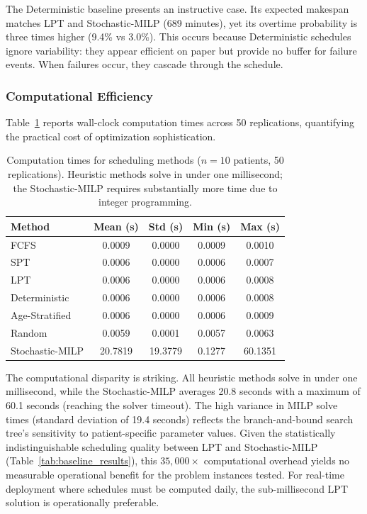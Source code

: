 \documentclass[11pt,a4paper]{article}
\begin{document}
The Deterministic baseline presents an instructive case. Its expected makespan matches LPT and Stochastic-MILP (689 minutes), yet its overtime probability is three times higher (9.4\% vs 3.0\%). This occurs because Deterministic schedules ignore variability: they appear efficient on paper but provide no buffer for failure events. When failures occur, they cascade through the schedule.

\subsubsection{Computational Efficiency}

Table~\ref{tab:computation_times} reports wall-clock computation times across 50 replications, quantifying the practical cost of optimization sophistication.

\begin{table}[H]
\centering
\caption{Computation times for scheduling methods ($n = 10$ patients, 50 replications). Heuristic methods solve in under one millisecond; the Stochastic-MILP requires substantially more time due to integer programming.}
\label{tab:computation_times}
\begin{tabular}{lcccc}
\toprule
Method & Mean (s) & Std (s) & Min (s) & Max (s) \\
\midrule
FCFS & 0.0009 & 0.0000 & 0.0009 & 0.0010 \\
SPT & 0.0006 & 0.0000 & 0.0006 & 0.0007 \\
LPT & 0.0006 & 0.0000 & 0.0006 & 0.0008 \\
Deterministic & 0.0006 & 0.0000 & 0.0006 & 0.0008 \\
Age-Stratified & 0.0006 & 0.0000 & 0.0006 & 0.0009 \\
Random & 0.0059 & 0.0001 & 0.0057 & 0.0063 \\
Stochastic-MILP & 20.7819 & 19.3779 & 0.1277 & 60.1351 \\
\bottomrule
\end{tabular}
\end{table}

The computational disparity is striking. All heuristic methods solve in under one millisecond, while the Stochastic-MILP averages 20.8 seconds with a maximum of 60.1 seconds (reaching the solver timeout). The high variance in MILP solve times (standard deviation of 19.4 seconds) reflects the branch-and-bound search tree's sensitivity to patient-specific parameter values. Given the statistically indistinguishable scheduling quality between LPT and Stochastic-MILP (Table~\ref{tab:baseline_results}), this $35{,}000\times$ computational overhead yields no measurable operational benefit for the problem instances tested. For real-time deployment where schedules must be computed daily, the sub-millisecond LPT solution is operationally preferable.
\end{document}
